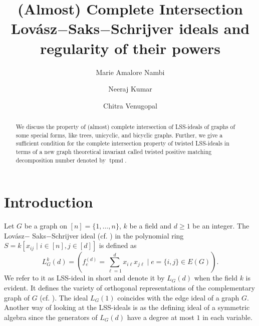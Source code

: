\documentclass[11pt,a4paper,reqno]{amsart}
\theoremstyle{definition}
\numberwithin{equation}{section}
\DeclareMathOperator{\tpmd}{tpmd}
\begin{document}
\title[(Almost) Complete Intersection LSS-ideals and regularity of their powers]{(Almost) Complete Intersection Lov\'{a}sz$-${S}aks$-${S}chrijver ideals and regularity of their powers}
\author[Marie Amalore Nambi]{Marie Amalore Nambi}
\address{Department of Mathematics, Indian Institute of Technology Hyderabad, Kandi, Sangareddy - $502285$, India}

\author[Neeraj Kumar]{Neeraj Kumar}

\author[Chitra Venugopal]{Chitra Venugopal}


\date{}

\begin{abstract}
We discuss the property of (almost) complete intersection of LSS-ideals of graphs of some special forms, like trees, unicyclic, and bicyclic graphs. Further, we give a sufficient condition for the complete intersection property of twisted LSS-ideals in terms of a new graph theoretical invariant called twisted positive matching decomposition number denoted by $\tpmd$. 
\end{abstract}

\maketitle

\section*{Introduction}

Let $G$ be a graph on $[n]=\{1,\ldots,n \}$, $k$ be a field and $d \geq 1$ be an integer. The Lov\'{a}sz$-$ {S}aks$-${S}chrijver ideal (cf. \cite{HMSW, LSS89}) in the polynomial ring $S=k[x_{ij} \mid i \in [n], j \in [d]]$ is defined as $$L_{G}^k(d)= ( f_e^{(d)}= \sum_{\ell=1}^{d}x_{i\ell}x_{j\ell} \mid e= \{i,j\} \in E(G)).$$
We refer to it as LSS-ideal in short and denote it by $L_{G}(d)$ when the field $k$ is evident. It defines the variety of orthogonal representations of the complementary graph of $G$ (cf. \cite{HMSW, LSS89}). The ideal  $L_G(1)$ coincides with the edge ideal of a graph $G$. Another way of looking at the LSS-ideals is as the defining ideal of a symmetric algebra since the generators of $L_G(d)$ have a degree at most $1$ in each variable. 
\end{document}
